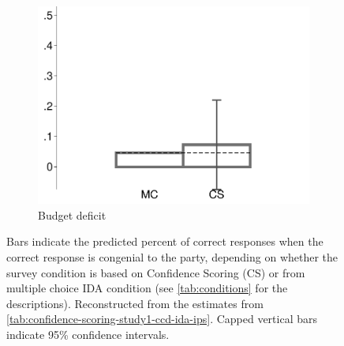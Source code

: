 \begin{figure}[t]
\begin{subfigure}{.325\textwidth}
		\includegraphics[width=\textwidth]{../figs/confidence_score_ccd_ida_ips_deficit_study1.pdf}
		\caption{Budget deficit}
	\end{subfigure}	
	\caption*{\footnotesize 
		Bars indicate the predicted percent of correct responses when the correct response is congenial to the party, depending on whether the survey condition is based on Confidence Scoring (CS) or from multiple choice IDA condition (see \cref{tab:conditions} for the descriptions).
		Reconstructed from the estimates from \cref{tab:confidence-scoring-study1-ccd-ida-ips}.
		Capped vertical bars indicate 95\% confidence intervals.
	}
	\label{fig:confidence-scoring-study1-ccd-ida-ips}
\end{figure}


